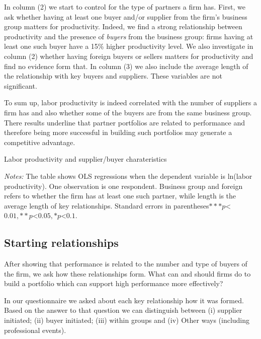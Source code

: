 \documentclass[final, dvipsnames, authoryear,12pt]{elsarticle}
\begin{document}
In column (2) we start to control for the type of partners a firm has. First, we ask whether having at least one buyer and/or supplier from the firm's business group matters for productivity. Indeed, we find a strong relationship between productivity and the presence of \textit{buyers} from the business group: firms having at least one such buyer have a 15\% higher productivity level. We also investigate in column (2) whether having foreign buyers or sellers matters for productivity and find no evidence form that. In column (3) we also include the average length of the relationship with key buyers and suppliers. These variables are not significant.

To sum up, labor productivity is indeed correlated with the number of suppliers a firm has and also whether some of the buyers are from the same business group. There results underline that partner portfolios are related to performance and therefore being more successful in building such portfolios may generate a competitive advantage.

\begin{table}[H]
    \caption{Labor productivity and supplier/buyer charateristics}
    \label{tab:prod_regs}
    \centerline{}
    {\scriptsize \textit{Notes:} The table shows OLS regressions when the dependent variable is ln(labor productivity). One observation is one respondent. Business group and foreign refers to whether the firm has at least one such partner, while length is the average length of key relationships. Standard errors in parentheses$ *** p$<$0.01, ** p$<$0.05, * p$<$0.1 $.}
\end{table}
    

\subsection{Starting relationships}

After showing that performance is related to the number and type of buyers of the firm, we ask how these relationships form. What can and should firms do to build a portfolio which can support high performance more effectively?

In our questionnaire we asked about each key relationship how it was formed. Based on the answer to that question we can distinguish between (i) supplier initiated; (ii) buyer initiated; (iii) within groups and (iv) Other ways (including professional events). 
\end{document}
